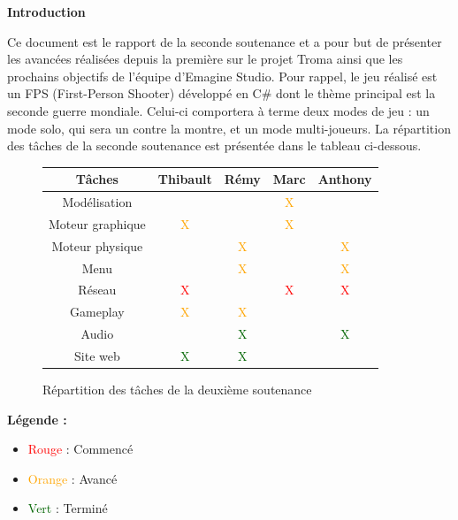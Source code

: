 \documentclass[11pt]{report}
\begin{document}
\tableofcontents

\newpage
\textbf{{\huge Introduction}} \vspace{7mm}

Ce document est le rapport de la seconde soutenance et a pour but de présenter les avancées réalisées depuis la première sur le projet Troma ainsi que les prochains objectifs de l’équipe d’Emagine Studio. Pour rappel, le jeu réalisé est un FPS (First-Person Shooter) développé en C\# dont le thème principal est la seconde guerre mondiale. Celui-ci comportera à terme deux modes de jeu : un mode solo, qui sera un contre la montre, et un mode multi-joueurs. La répartition des tâches de la seconde soutenance est présentée dans le tableau ci-dessous.

\begin{figure}[htbp]
\centering
\begin{tabular}{ | c || c | c | c | c | }
\hline Tâches & Thibault & Rémy & Marc & Anthony \\
\hline Modélisation & & & \textcolor{orange}{X} & \\
\hline Moteur graphique & \textcolor{orange}{X} & & \textcolor{orange}{X} & \\
\hline Moteur physique & & \textcolor{orange}{X} & & \textcolor{orange}{X} \\
\hline Menu & & \textcolor{orange}{X} & & \textcolor{orange}{X} \\
\hline Réseau & \textcolor{red}{X} & & \textcolor{red}{X} & \textcolor{red}{X} \\
\hline Gameplay & \textcolor{orange}{X} & \textcolor{orange}{X} & & \\
\hline Audio & & \textcolor{darkgreen}{X} & & \textcolor{darkgreen}{X} \\
\hline Site web & \textcolor{darkgreen}{X} & \textcolor{darkgreen}{X} & & \\
\hline
\end{tabular}
\caption{Répartition des tâches de la deuxième soutenance}
\end{figure}

\textbf{Légende :}
\begin{itemize}
  \item \textcolor{red}{Rouge} : Commencé
  \item \textcolor{orange}{Orange} : Avancé
  \item \textcolor{darkgreen}{Vert} : Terminé
\end{itemize}
\vspace*{7mm}
\end{document}
